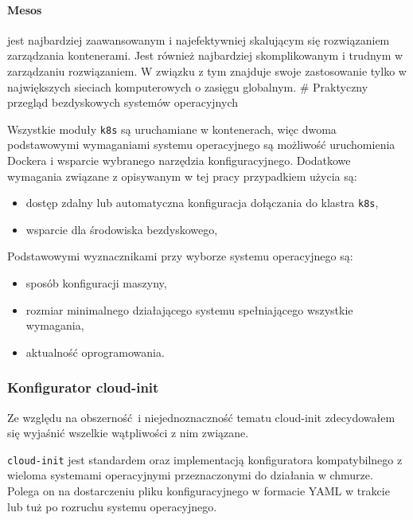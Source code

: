 \documentclass[a4paper,12pt,twoside,openany]{report}
\providecommand{\tightlist}{%
  \setlength{\itemsep}{0pt}\setlength{\parskip}{0pt}}
\newcommand{\passthrough}[1]{#1}
\renewcommand{\href}[2]{#2\endnote{\url{#1}}}
\begin{document}
\hypertarget{mesos}{%
\paragraph{Mesos}\label{mesos}}

jest najbardziej zaawansowanym i najefektywniej skalującym się
rozwiązaniem zarządzania kontenerami. Jest również najbardziej
skomplikowanym i trudnym w zarządzaniu rozwiązaniem. W związku z tym
znajduje swoje zastosowanie tylko w największych sieciach komputerowych
o zasięgu globalnym. \# Praktyczny przegląd bezdyskowych systemów
operacyjnych

Wszystkie moduły \passthrough{\lstinline!k8s!} są uruchamiane w
kontenerach, więc dwoma podstawowymi wymaganiami systemu operacyjnego są
możliwość uruchomienia Dockera i wsparcie wybranego narzędzia
konfiguracyjnego. Dodatkowe wymagania związane z opisywanym w tej pracy
przypadkiem użycia są:

\begin{itemize}
\tightlist
\item
  dostęp zdalny lub automatyczna konfiguracja dołączania do klastra
  \passthrough{\lstinline!k8s!},
\item
  wsparcie dla środowiska bezdyskowego,
\end{itemize}

Podstawowymi wyznacznikami przy wyborze systemu operacyjnego są:

\begin{itemize}
\tightlist
\item
  sposób konfiguracji maszyny,
\item
  rozmiar minimalnego działającego systemu spełniającego wszystkie
  wymagania,
\item
  aktualność oprogramowania.
\end{itemize}

\hypertarget{cloud-init-config}{%
\subsubsection{Konfigurator cloud-init}\label{cloud-init-config}}

Ze względu na obszerność~i niejednoznaczność tematu cloud-init
zdecydowałem się wyjaśnić wszelkie wątpliwości z nim związane.

\href{https://cloud-init.io/}{\passthrough{\lstinline!cloud-init!}} jest
standardem oraz implementacją konfiguratora kompatybilnego z wieloma
systemami operacyjnymi przeznaczonymi do działania w chmurze. Polega on
na dostarczeniu pliku konfiguracyjnego w formacie
\href{http://yaml.org/}{YAML} w trakcie lub tuż po rozruchu systemu
operacyjnego.
\end{document}

